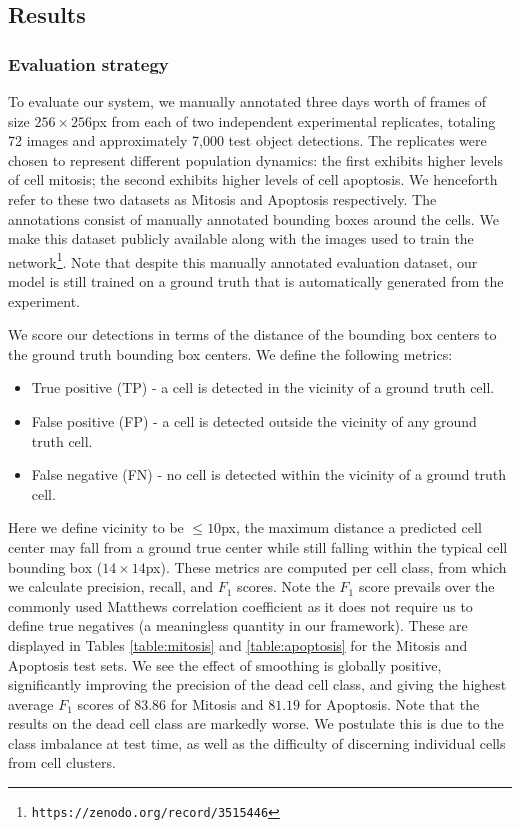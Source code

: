 \subsection{Results}
\label{subsec:results}

\subsubsection{Evaluation strategy}
\label{subsubsec:evaluation}

To evaluate our system, we manually annotated three days worth of frames of size $256 \times 256$px from each of two independent experimental replicates, totaling 72 images and approximately 7,000 test object detections. The replicates were chosen to represent different population dynamics: the first exhibits higher levels of cell mitosis; the second exhibits higher levels of cell apoptosis. We henceforth refer to these two datasets as Mitosis and Apoptosis respectively. The annotations consist of manually annotated bounding boxes around the cells. We make this dataset publicly available along with the images used to train the network\footnote{\texttt{https://zenodo.org/record/3515446}}. Note that despite this manually annotated evaluation dataset, our model is still trained on a ground truth that is automatically generated from the experiment.


We score our detections in terms of the distance of the bounding box centers to the ground truth bounding box centers. We define the following metrics:

\begin{itemize}
\item True positive (TP) - a cell is detected in the vicinity of a ground truth cell.
\item False positive (FP) - a cell is detected outside the vicinity of any ground truth cell.
\item False negative (FN) - no cell is detected within the vicinity of a ground truth cell.
\end{itemize}

Here we define vicinity to be $\leq 10$px, the maximum distance a predicted cell center may fall from a ground true center while still falling within the typical cell bounding box ($14 \times 14$px). These metrics are computed per cell class, from which we calculate precision, recall, and $F_1$ scores. Note the $F_1$ score prevails over the commonly used Matthews correlation coefficient as it does not require us to define true negatives (a meaningless quantity in our framework). These are displayed in Tables \ref{table:mitosis} and \ref{table:apoptosis} for the Mitosis and Apoptosis test sets. We see the effect of smoothing is globally positive, significantly improving the precision of the dead cell class, and giving the highest average $F_1$ scores of $83.86$ for Mitosis and $81.19$ for Apoptosis. Note that the results on the dead cell class are markedly worse. We postulate this is due to the class imbalance at test time, as well as the difficulty of discerning individual cells from cell clusters.

